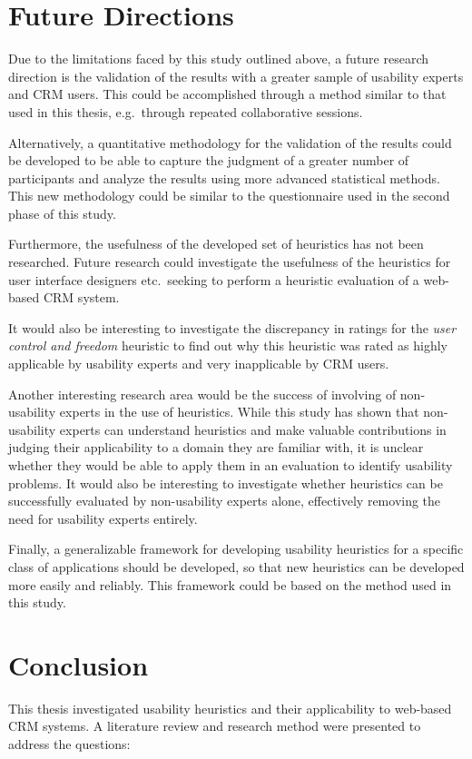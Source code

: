 \section{Future Directions}
\label{sec:future_research}
Due to the limitations faced by this study outlined above, a future research direction is the validation of the results with a greater sample of usability experts and CRM users. This could be accomplished through a method similar to that used in this thesis, e.g.\ through repeated collaborative sessions.

Alternatively, a quantitative methodology for the validation of the results could be developed to be able to capture the judgment of a greater number of participants and analyze the results using more advanced statistical methods. This new methodology could be similar to the questionnaire used in the second phase of this study.

Furthermore, the usefulness of the developed set of heuristics has not been researched. Future research could investigate the usefulness of the heuristics for user interface designers etc.\ seeking to perform a heuristic evaluation of a web-based CRM system.

It would also be interesting to investigate the discrepancy in ratings for the \textit{user control and freedom} heuristic to find out why this heuristic was rated as highly applicable by usability experts and very inapplicable by CRM users.

Another interesting research area would be the success of involving of non-usability experts in the use of heuristics. While this study has shown that non-usability experts can understand heuristics and make valuable contributions in judging their applicability to a domain they are familiar with, it is unclear whether they would be able to apply them in an evaluation to identify usability problems. It would also be interesting to investigate whether heuristics can be successfully evaluated by non-usability experts alone, effectively removing the need for usability experts entirely.

Finally, a generalizable framework for developing usability heuristics for a specific class of applications should be developed, so that new heuristics can be developed more easily and reliably. This framework could be based on the method used in this study.

\section{Conclusion}
\label{sec:conclusions}
This thesis investigated usability heuristics and their applicability to web-based CRM systems. A literature review and research method were presented to address the questions:

